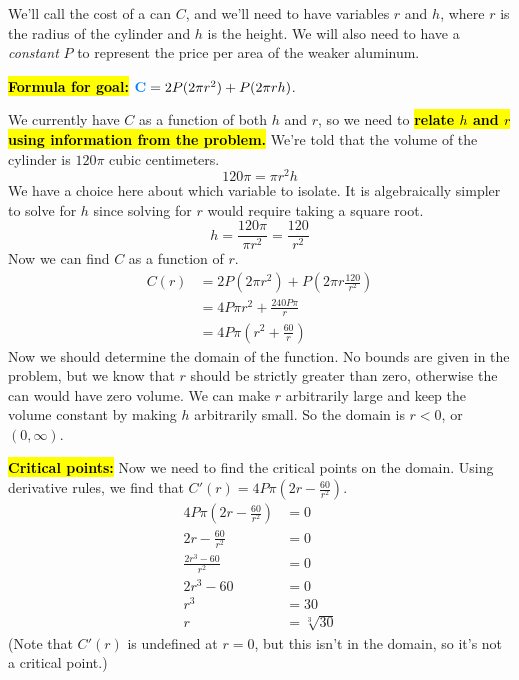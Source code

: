 \documentclass{article}
\newcommand{\highlight}[1]{\boldmath\hl{\textbf{#1}}\unboldmath}
\newcommand{\goal}[1]{\textbf{\textcolor{skyblue}{#1}}}
\begin{document}
\begin{enumerate}
\begin{solution}
        We'll call the cost of a can $C$, and we'll need to have variables $r$ and $h$, where
        $r$ is the radius of the cylinder and $h$ is the height. We will also
        need to have a \textit{constant} $P$ to represent the price per area of
        the weaker aluminum.

        \highlight{Formula for goal:} $\goal{C} = 2P(2\pi r^2) + P(2\pi r h)$.
        
        We currently have $C$ as a function of both $h$ and $r$, so we
        need to \highlight{relate $h$ and $r$ using information from the problem.} We're
        told that the volume of the cylinder is $120\pi$ cubic centimeters.
        $$ 120 \pi = \pi r^2 h$$ 
        We have a choice here about which variable to isolate. It is algebraically simpler
        to solve for $h$ since solving for $r$ would require taking a square root. 
        $$ h = \frac{120 \pi}{\pi r^2} = \frac{120}{r^2}$$ 
        Now we can find $C$ as a function of $r$.
        \begin{align*}
        C(r) &= 2P(2 \pi r^2) + P(2 \pi r \frac{120}{r^2}) \\
        &=4P \pi r^2 +\frac{240P\pi}{r} \\
        &= 4P\pi\left(r^2 + \frac{60}{r}\right)
        \end{align*}
        Now we should determine the domain of the function. No bounds
        are given in the problem, but we know that $r$ should be strictly
        greater than zero, otherwise the can would have zero volume. We can make
        $r$ arbitrarily large and keep the volume constant by making $h$ arbitrarily small.
        So the domain is $r < 0$, or $(0, \infty)$.
        
        \highlight{Critical points:} Now we need to find the critical points on the domain.
        Using derivative rules, we find that 
        $C'(r) = 4P\pi\left(2r - \frac{60}{r^2}\right)$.
        \begin{align*}
          4P\pi\left(2r - \frac{60}{r^2}\right) &= 0 \\
          2r - \frac{60}{r^2} &= 0 \\
          \frac{2r^3 - 60}{r^2} &= 0 \\
          2r^3 - 60 &= 0 \\
          r^3 &= 30 \\
          r &= \sqrt[3]{30}
        \end{align*}
        (Note that $C'(r)$ is undefined at $r=0$, but this isn't in the domain,
        so it's not a critical point.)


\end{solution}
\end{enumerate}
\end{document}
